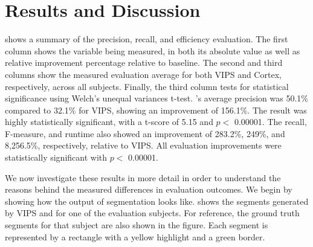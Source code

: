 \section{Results and Discussion}




 shows a summary of
the precision, recall, and efficiency evaluation. 
The first column shows the variable being measured,
in both its absolute value as well as relative improvement percentage
relative to baseline.
The second and third columns show the
measured evaluation average for both VIPS and Cortex,
respectively, across all subjects.
Finally, the third column tests for statistical significance
using Welch's unequal variances t-test. 
\toolname's average precision was 50.1\%
compared to 32.1\% for VIPS, showing an improvement of 156.1\%.
The result was highly statistically significant,
with a t-score of 5.15 and $p <$ 0.00001.
The recall, F-measure, and runtime
also showed an improvement of 283.2\%, 249\%, and 8,256.5\%, 
respectively, relative to VIPS.
All evaluation improvements were statistically significant with $p <$ 0.00001.

We now investigate these results in more detail
in order to understand the reasons behind
the measured differences in evaluation outcomes.
We begin by showing how the output of segmentation looks like.
 shows the segments generated
by VIPS and \toolname for one of the evaluation subjects.
For reference, the ground truth segments for that subject
are also shown in the figure.
Each segment is represented by a rectangle
with a yellow highlight and a green border.

